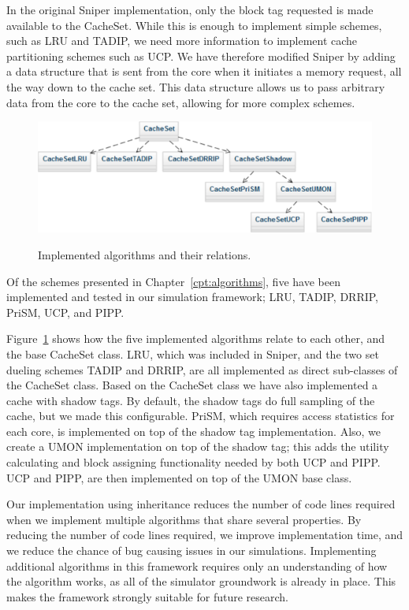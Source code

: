 In the original Sniper implementation, only the block tag requested is made available to the CacheSet. 
While this is enough to implement simple schemes, such as LRU and TADIP, we need more information to implement cache partitioning schemes such as UCP.
We have therefore modified Sniper by adding a data structure that is sent from the core when it initiates a memory request, all the way down to the cache set.
This data structure allows us to pass arbitrary data from the core to the cache set, allowing for more complex schemes.

\begin{figure}[ht]
\centering
\includegraphics[scale=0.7]{figures/framework/algorithms}
\label{fig:framework:implementation:algorithms}
\caption{Implemented algorithms and their relations.}
\end{figure}

Of the schemes presented in Chapter~\ref{cpt:algorithms}, five have been implemented and tested in our simulation framework; LRU, TADIP, DRRIP, PriSM, UCP, and PIPP.

Figure~\ref{fig:framework:implementation:algorithms} shows how the five implemented algorithms relate to each other, and the base CacheSet class.
LRU, which was included in Sniper, and the two set dueling schemes TADIP and DRRIP, are all implemented as direct sub-classes of the CacheSet class.
Based on the CacheSet class we have also implemented a cache with shadow tags.
By default, the shadow tags do full sampling of the cache, but we made this configurable.
PriSM, which requires access statistics for each core, is implemented on top of the shadow tag implementation.
Also, we create a UMON implementation on top of the shadow tag; this adds the utility calculating and block assigning functionality needed by both UCP and PIPP.
UCP and PIPP, are then implemented on top of the UMON base class.

Our implementation using inheritance reduces the number of code lines required when we implement multiple algorithms that share several properties.
By reducing the number of code lines required, we improve implementation time, and we reduce the chance of bug causing issues in our simulations.
Implementing additional algorithms in this framework requires only an understanding of how the algorithm works, as all of the simulator groundwork is already in place.
This makes the framework strongly suitable for future research.